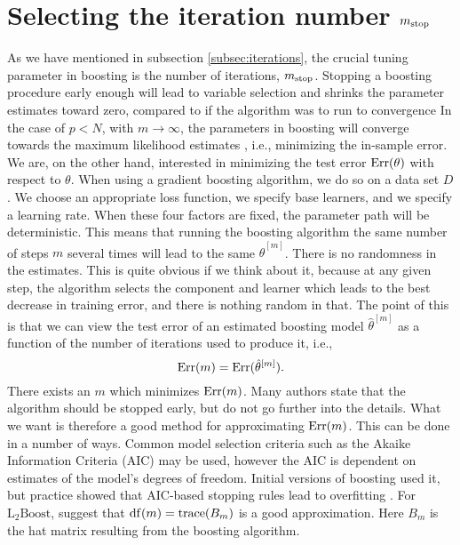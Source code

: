
\section{Selecting the iteration number $m_{\text{stop}}$}
\label{sec:stop}
As we have mentioned in subsection \ref{subsec:iterations}, the crucial tuning parameter in boosting is the number of iterations, $m_{\text{stop}}$. 
Stopping a boosting procedure early enough will lead to variable selection and shrinks the parameter estimates toward zero, compared to if the algorithm was to run to convergence
In the case of $p<N$, with $m\to\infty$, the parameters in boosting will converge towards the maximum likelihood estimates \citep{DeBin2016}, i.e., minimizing the in-sample error.
We are, on the other hand, interested in minimizing the test error $\text{Err}(\theta)$ with respect to $\theta$.
When using a gradient boosting algorithm, we do so on a data set $D$.
We choose an appropriate loss function, we specify base learners, and we specify a learning rate.
When these four factors are fixed, the parameter path will be deterministic.
This means that running the boosting algorithm the same number of steps $m$ several times will lead to the same $\hat{\theta}^{[m]}$.
There is no randomness in the estimates.
This is quite obvious if we think about it, because at any given step, the algorithm selects the component and learner which leads to the best decrease in training error, and there is nothing random in that.
The point of this is that we can view the test error of an estimated boosting model $\hat{\theta}^{[m]}$ as a function of the number of iterations used to produce it, i.e.,
\begin{equation}\label{test-error-m}
    \text{Err}(m)=\text{Err}(\hat{\theta}^{[m]}).
\end{equation}
There exists an $m$ which minimizes $\text{Err}(m)$.
Many authors state that the algorithm should be stopped early, but do not go further into the details.
What we want is therefore a good method for approximating $\text{Err}(m)$.
This can be done in a number of ways.
Common model selection criteria such as the Akaike Information Criteria (AIC) may be used, however the AIC is dependent on estimates of the model's degrees of freedom. 
Initial versions of boosting used it, but practice showed that AIC-based stopping rules lead to overfitting \citep{mayr-hofner}.
For $\text{L}_2\text{Boost}$, \citet{buhlmann2007} suggest that $\operatorname{df}(m)=\operatorname{trace}(B_m)$ is a good approximation.
Here $B_m$ is the hat matrix resulting from the boosting algorithm.
